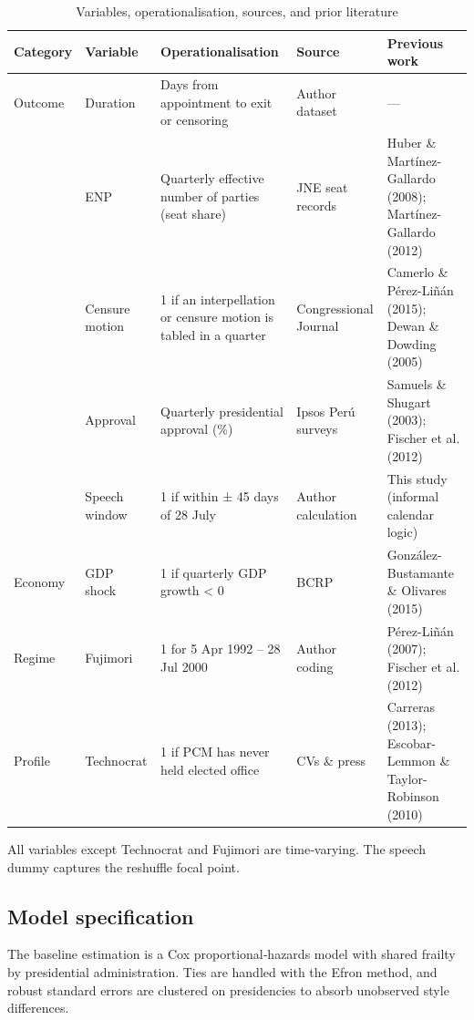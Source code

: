 \documentclass[a4paper, 12pt]{article}
\begin{document}
\begin{table}
\centering
\caption{Variables, operationalisation, sources, and prior literature}
\label{tab:vars-rotated}
\renewcommand{\arraystretch}{1.2}
\begin{tabularx}{\textheight}{@{}l l X X X@{}}
\toprule
\textbf{Category} & \textbf{Variable} & \textbf{Operationalisation} & \textbf{Source} & \textbf{Previous work} \\
\midrule
Outcome 
  & Duration 
  & Days from appointment to exit or censoring 
  & Author dataset 
  & — \\ 
\addlinespace
\multirow{2}{*}{Congress} 
  & ENP 
  & Quarterly effective number of parties (seat share) 
  & JNE seat records 
  & Huber \& Martínez-Gallardo (2008); Martínez-Gallardo (2012) \\
  & Censure motion 
  & 1 if an interpellation or censure motion is tabled in a quarter 
  & Congressional Journal 
  & Camerlo \& Pérez-Liñán (2015); Dewan \& Dowding (2005) \\
\addlinespace
\multirow{2}{*}{Presidency} 
  & Approval 
  & Quarterly presidential approval (\%) 
  & Ipsos Perú surveys 
  & Samuels \& Shugart (2003); Fischer et al. (2012) \\
  & Speech window 
  & 1 if within ± 45 days of 28 July 
  & Author calculation 
  & This study (informal calendar logic) \\
\addlinespace
Economy 
  & GDP shock 
  & 1 if quarterly GDP growth < 0 
  & BCRP 
  & González-Bustamante \& Olivares (2015) \\ 
\addlinespace
Regime 
  & Fujimori 
  & 1 for 5 Apr 1992 – 28 Jul 2000 
  & Author coding 
  & Pérez-Liñán (2007); Fischer et al. (2012) \\ 
\addlinespace
Profile 
  & Technocrat 
  & 1 if PCM has never held elected office 
  & CVs \& press 
  & Carreras (2013); Escobar-Lemmon \& Taylor-Robinson (2010) \\
\bottomrule
\end{tabularx}
\end{table}

All variables except Technocrat and Fujimori are time‑varying. The speech dummy captures the reshuffle focal point.

\subsection{Model specification}

The baseline estimation is a Cox proportional‑hazards model with shared frailty by presidential administration. Ties are handled with the Efron method, and robust standard errors are clustered on presidencies to absorb unobserved style differences.
\end{document}
